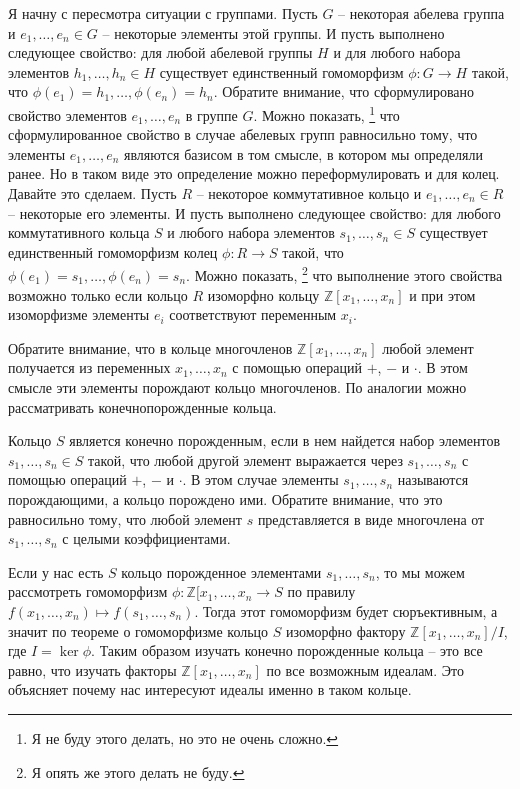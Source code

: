 Я начну с пересмотра ситуации с группами.
Пусть $G$ -- некоторая абелева группа и $e_1,\ldots, e_n\in G$ -- некоторые элементы этой группы.
И пусть выполнено следующее свойство: для любой абелевой группы $H$ и для любого набора элементов $h_1,\ldots, h_n\in H$ существует единственный гомоморфизм $\phi\colon G\to H$ такой, что $\phi(e_1) = h_1,\ldots,\phi(e_n) = h_n$.
Обратите внимание, что сформулировано свойство элементов $e_1,\ldots,e_n$ в группе $G$.
Можно показать,%
\footnote{Я не буду этого делать, но это не очень сложно.}
что сформулированное свойство в случае абелевых групп равносильно тому, что элементы $e_1,\ldots,e_n$ являются базисом в том смысле, в котором мы определяли ранее.
Но в таком виде это определение можно переформулировать и для колец.
Давайте это сделаем.
Пусть $R$ -- некоторое коммутативное кольцо и $e_1,\ldots,e_n\in R$ -- некоторые его элементы.
И пусть выполнено следующее свойство: для любого коммутативного кольца $S$ и любого набора элементов $s_1,\ldots,s_n\in S$ существует единственный гомоморфизм колец $\phi\colon R\to S$ такой, что $\phi(e_1) = s_1,\ldots,\phi(e_n) = s_n$.
Можно показать,%
\footnote{Я опять же этого делать не буду.}
что выполнение этого свойства возможно только если кольцо $R$ изоморфно кольцу $\mathbb Z[x_1,\ldots,x_n]$ и при этом изоморфизме элементы $e_i$ соответствуют переменным $x_i$.

Обратите внимание, что в кольце многочленов $\mathbb Z[x_1,\ldots,x_n]$ любой элемент получается из переменных $x_1,\ldots, x_n$ с помощью операций $+$, $-$ и $\cdot$.
В этом смысле эти элементы порождают кольцо многочленов.
По аналогии можно рассматривать конечнопорожденные кольца.

\begin{definition}
Кольцо $S$ является конечно порожденным, если в нем найдется набор элементов $s_1,\ldots, s_n\in S$ такой, что любой другой элемент выражается через $s_1,\ldots,s_n$ с помощью операций $+$, $-$ и $\cdot$.
В этом случае элементы $s_1,\ldots, s_n$ называются порождающими, а кольцо порождено ими.
Обратите внимание, что это равносильно тому, что любой элемент $s$ представляется в виде многочлена от $s_1,\ldots,s_n$ с целыми коэффициентами.
\end{definition}

Если у нас есть $S$ кольцо порожденное элементами $s_1,\ldots, s_n$, то мы можем рассмотреть гомоморфизм $\phi\colon \mathbb Z[x_1,\ldots,x_n\to S$ по правилу $f(x_1,\ldots,x_n) \mapsto f(s_1,\ldots,s_n)$.
Тогда этот гомоморфизм будет сюръективным, а значит по теореме о гомоморфизме кольцо $S$ изоморфно фактору $\mathbb Z[x_1,\ldots, x_n] / I$, где $I = \ker \phi$.
Таким образом изучать конечно порожденные кольца -- это все равно, что изучать факторы $\mathbb Z[x_1,\ldots, x_n]$ по все возможным идеалам.
Это объясняет почему нас интересуют идеалы именно в таком кольце.


